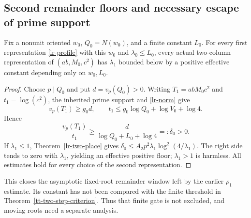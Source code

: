 \subsection{Second remainder floors and necessary escape of prime support}
\begin{corollary}
\label{lr-fixed-root}
Fix a nonunit oriented $w_0$, $Q_0=N(w_0)$, and a finite constant $L_0$.
For every first representation \eqref{lr-profile} with this $w_0$ and
$\lambda_0\le L_0$, every actual two-column representation of
$(ab,M_0,c^2)$ has $\lambda_1$ bounded below by a positive effective
constant depending only on $w_0,L_0$.
\end{corollary}
\begin{proof}
Choose $p\mid Q_0$ and put $d=v_p(Q_0)>0$.
Writing $T_1=abM_0c^2$ and $t_1=\log(c^2)$, the inherited prime support
and \eqref{lr-norm} give
\[
 v_p(T_1)\ge g_0d,\qquad
 t_1\le g_0\log Q_0+\log V_0+\log4.
\]
Hence
\[
 \frac{v_p(T_1)}{t_1}
 \ge\frac{d}{\log Q_0+L_0+\log4}=:\delta_0>0.
\]
If $\lambda_1\le1$, Theorem~\ref{lr-two-place} gives
$\delta_0\le A_2p^2\lambda_1\log^2(4/\lambda_1)$.
The right side tends to zero with $\lambda_1$, yielding an effective
positive floor; $\lambda_1>1$ is harmless. All estimates hold for every
choice of the second representation.
\end{proof}
This closes the asymptotic fixed-root remainder window left by the earlier
$\rho_1$ estimate. Its constant has not been compared with the finite
threshold in Theorem~\ref{tt-two-step-criterion}. Thus that finite gate is
not excluded, and moving roots need a separate analysis.

